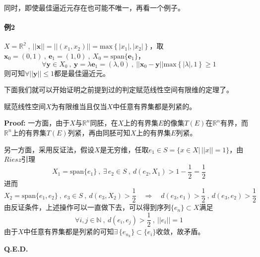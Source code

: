 同时，即使最佳逼近元存在也可能不唯一，再看一个例子。

\paragraph*{例2} \quad $X=\mathbb{R^2} \ , \ ||\mathbf{x}||=||(x_1,x_2)||=\text{max}\left\{|x_1|,|x_2|\right\}$，取$\mathbf{x}_0=(0,1) \ , \ \mathbf{e}_1=(1,0) \ , \ X_0=\text{span}\{\mathbf{e}_1\}$，
\[\forall \mathbf{y} \in X_0 \ , \ \mathbf{y}=\lambda \mathbf{e}_1=(\lambda,0) \ , \ ||\mathbf{x}_0-\mathbf{y}||\text{max}\left\{|\lambda|,1\right\} \geq 1\]
则可知$\forall ||\mathbf{y}|| \leq 1$都是最佳逼近元。

下面我们就可以开始证明之前提到过的判定赋范线性空间有限维的定理了。

\begin{theorem}
    赋范线性空间$X$为有限维当且仅当$X$中任意有界集都是列紧的。
\end{theorem}
\textbf{Proof:} 一方面，由于$X$与$\mathbb{R}^n$同胚，在$X$上的有界集$E$的像集$T(E)$在$\mathbb{R}^n$有界，而$\mathbb{R}^n$上的有界集$T(E)$列紧，再由同胚可知$X$上的有界集$E$列紧。

另一方面，采用反证法，假设$X$是无穷维，任取$e_1 \in S=\{x \in X | \, ||x||=1\}$，由$Riesz$引理
\[X_1=\text{span}\{e_1\} \ , \ \exists \, e_2 \in S \ , \ d(e_2,X_1)>1-\frac{1}{2}=\frac{1}{2}\]
进而
\[X_2=\text{span}\{e_1,e_2\} \ , \ e_3 \in S \ , \ d(e_3,X_2)>\frac{1}{2} \quad \Rightarrow \quad d(e_3,e_1)>\frac{1}{2} \ , \ d(e_3,e_2)>\frac{1}{2}\]
由反证条件，上述操作可以一直做下去，可以得到序列$\{e_n\} \subset X$满足
\[\forall i,j \in \mathbb{N} \ , \ d(e_i,e_j)>\frac{1}{2} \ , \ ||e_i||=1\]
由于$X$中任意有界集都是列紧的可知$\exists \, \{e_{n_k}\} \subset \{e_i\}$收敛，故矛盾。

\textbf{Q.E.D.}